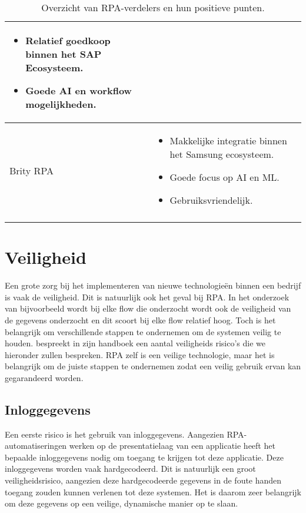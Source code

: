 \begin{longtable}{|p{3cm}|p{12cm}|}
\begin{itemize}[left=0pt]
                                        \item Relatief goedkoop binnen het SAP Ecosysteem.
                                        \item Goede AI en workflow mogelijkheden.
                                    \end{itemize} \\
    \hline
    Brity RPA & \begin{itemize}[left=0pt]
                    \item Makkelijke integratie binnen het Samsung ecosysteem.
                    \item Goede focus op AI en ML.
                    \item Gebruiksvriendelijk.
                \end{itemize} \\
    \hline

    \caption{Overzicht van RPA-verdelers en hun positieve punten.}
    \label{tab:rpa-overzicht}
\end{longtable}

\section{Veiligheid}
\label{sec:veiligheid}

Een grote zorg bij het implementeren van nieuwe technologieën binnen een bedrijf is vaak de veiligheid. Dit is natuurlijk ook het geval bij RPA. In het onderzoek van \textcite{Liu2023} bijvoorbeeld wordt bij elke flow die onderzocht wordt ook de veiligheid van de gegevens onderzocht en dit scoort bij elke flow relatief hoog.
Toch is het belangrijk om verschillende stappen te ondernemen om de systemen veilig te houden. \textcite{Taulli2020} bespreekt in zijn handboek een aantal veiligheids risico's die we hieronder zullen bespreken.
RPA zelf is een veilige technologie, maar het is belangrijk om de juiste stappen te ondernemen zodat een veilig gebruik ervan kan gegarandeerd worden.

\subsection{Inloggegevens}
\label{subsec:inloggegevens}

Een eerste risico is het gebruik van inloggegevens. Aangezien RPA-automatiseringen werken op de presentatielaag van een applicatie heeft het bepaalde inloggegevens nodig om toegang te krijgen tot deze applicatie. Deze inloggegevens worden vaak hardgecodeerd.
Dit is natuurlijk een groot veiligheidsrisico, aangezien deze hardgecodeerde gegevens in de foute handen toegang zouden kunnen verlenen tot deze systemen. Het is daarom zeer belangrijk om deze gegevens op een veilige, dynamische manier op te slaan.

